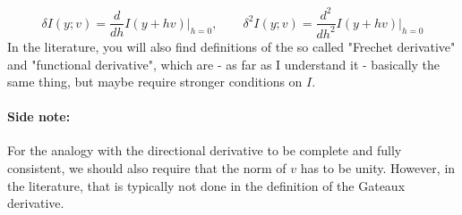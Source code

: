 \begin{equation}
 \delta   I(y; v) = \frac{d}  {d h  } I(y + h v) \bigg\rvert_{h=0}, \qquad
 \delta^2 I(y; v) = \frac{d^2}{d h^2} I(y + h v) \bigg\rvert_{h=0}
\end{equation}
In the literature, you will also find definitions of the so called "Frechet derivative" and "functional derivative", which are - as far as I understand it - basically the same thing, but maybe require stronger conditions on $I$.


\paragraph{Side note:} For the analogy with the directional derivative to be complete and fully consistent, we should also require that the norm of $v$ has to be unity. However, in the literature, that is typically not done in the definition of the Gateaux derivative. %




